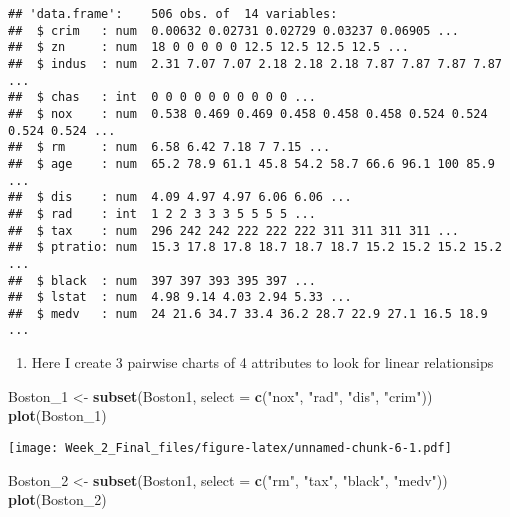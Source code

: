 \documentclass[]{article}
\newenvironment{Shaded}{\begin{snugshade}}{\end{snugshade}}
\newcommand{\KeywordTok}[1]{\textcolor[rgb]{0.13,0.29,0.53}{\textbf{#1}}}
\newcommand{\DataTypeTok}[1]{\textcolor[rgb]{0.13,0.29,0.53}{#1}}
\newcommand{\DecValTok}[1]{\textcolor[rgb]{0.00,0.00,0.81}{#1}}
\newcommand{\StringTok}[1]{\textcolor[rgb]{0.31,0.60,0.02}{#1}}
\newcommand{\NormalTok}[1]{#1}
\providecommand{\tightlist}{%
  \setlength{\itemsep}{0pt}\setlength{\parskip}{0pt}}
\begin{document}
\begin{verbatim}
## 'data.frame':    506 obs. of  14 variables:
##  $ crim   : num  0.00632 0.02731 0.02729 0.03237 0.06905 ...
##  $ zn     : num  18 0 0 0 0 0 12.5 12.5 12.5 12.5 ...
##  $ indus  : num  2.31 7.07 7.07 2.18 2.18 2.18 7.87 7.87 7.87 7.87 ...
##  $ chas   : int  0 0 0 0 0 0 0 0 0 0 ...
##  $ nox    : num  0.538 0.469 0.469 0.458 0.458 0.458 0.524 0.524 0.524 0.524 ...
##  $ rm     : num  6.58 6.42 7.18 7 7.15 ...
##  $ age    : num  65.2 78.9 61.1 45.8 54.2 58.7 66.6 96.1 100 85.9 ...
##  $ dis    : num  4.09 4.97 4.97 6.06 6.06 ...
##  $ rad    : int  1 2 2 3 3 3 5 5 5 5 ...
##  $ tax    : num  296 242 242 222 222 222 311 311 311 311 ...
##  $ ptratio: num  15.3 17.8 17.8 18.7 18.7 18.7 15.2 15.2 15.2 15.2 ...
##  $ black  : num  397 397 393 395 397 ...
##  $ lstat  : num  4.98 9.14 4.03 2.94 5.33 ...
##  $ medv   : num  24 21.6 34.7 33.4 36.2 28.7 22.9 27.1 16.5 18.9 ...
\end{verbatim}

\begin{enumerate}
\def\labelenumi{\arabic{enumi})}
\setcounter{enumi}{2}
\tightlist
\item
  Here I create 3 pairwise charts of 4 attributes to look for linear
  relationsips
\end{enumerate}

\begin{Shaded}
\begin{Highlighting}[]
\NormalTok{Boston_}\DecValTok{1}\NormalTok{ <-}\StringTok{ }\KeywordTok{subset}\NormalTok{(Boston1, }\DataTypeTok{select =} \KeywordTok{c}\NormalTok{(}\StringTok{"nox"}\NormalTok{, }\StringTok{"rad"}\NormalTok{, }\StringTok{"dis"}\NormalTok{, }\StringTok{"crim"}\NormalTok{))}
\KeywordTok{plot}\NormalTok{(Boston_}\DecValTok{1}\NormalTok{)}
\end{Highlighting}
\end{Shaded}

\texttt{[image: Week\_2\_Final\_files/figure-latex/unnamed-chunk-6-1.pdf]}

\begin{Shaded}
\begin{Highlighting}[]
\NormalTok{Boston_}\DecValTok{2}\NormalTok{ <-}\StringTok{ }\KeywordTok{subset}\NormalTok{(Boston1, }\DataTypeTok{select =} \KeywordTok{c}\NormalTok{(}\StringTok{"rm"}\NormalTok{, }\StringTok{"tax"}\NormalTok{, }\StringTok{"black"}\NormalTok{, }\StringTok{"medv"}\NormalTok{))}
\KeywordTok{plot}\NormalTok{(Boston_}\DecValTok{2}\NormalTok{)}
\end{Highlighting}
\end{Shaded}
\end{document}
